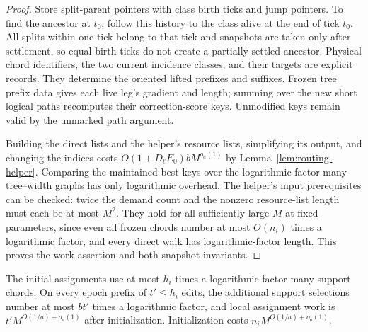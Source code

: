 \begin{proof}
Store split-parent pointers with class birth ticks and jump pointers.
To find the ancestor at $t_0$, follow this history to the class alive
at the end of tick $t_0$.  All splits within one tick belong to that
tick and snapshots are taken only after settlement, so equal birth
ticks do not create a partially settled ancestor.  Physical chord
identifiers, the two current incidence classes, and their targets
are explicit records.  They determine the oriented lifted prefixes
and suffixes.  Frozen tree prefix data gives each live leg's gradient
and length; summing over the new short logical paths recomputes their
correction-score keys.  Unmodified keys remain valid by the unmarked
path argument.

Building the direct lists and the helper's resource lists, simplifying
its output, and changing the indices costs
$O(1+D_\ell E_0)bM^{o_a(1)}$ by
Lemma~\ref{lem:routing-helper}.  Comparing the maintained best keys
over the logarithmic-factor many tree--width graphs has only
logarithmic overhead.  The helper's input prerequisites can be checked:
twice the demand count and the nonzero resource-list length must each
be at most $M^2$.  They hold for all sufficiently large $M$ at fixed
parameters, since even all frozen chords number at most
$O(n_i)$ times a logarithmic factor, and every direct walk has
logarithmic-factor length.  This proves the work assertion and both
snapshot invariants.
\end{proof}

\begin{lemma}
\label{update:support}
The initial assignments use at most $h_i$ times a logarithmic factor
many support chords.  On every epoch prefix of $t'\le h_i$ edits, the
additional support selections number at most $bt'$ times a logarithmic
factor, and local assignment work is
$t'M^{O(1/a)+o_a(1)}$ after initialization.  Initialization costs
$n_iM^{O(1/a)+o_a(1)}$.
\end{lemma}

